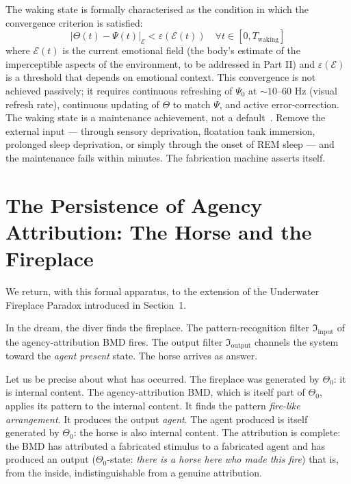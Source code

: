 The waking state is formally characterised as the condition in which the convergence criterion is satisfied:
%
\begin{equation}
|\Theta(t) - \Psi(t)|_{\mathcal{E}} < \varepsilon(\mathcal{E}(t)) \quad \forall t \in [0, T_{\mathrm{waking}}]
\label{eq:convergence}
\end{equation}
%
where $\mathcal{E}(t)$ is the current emotional field (the body's estimate of the imperceptible aspects of the environment, to be addressed in Part II) and $\varepsilon(\mathcal{E})$ is a threshold that depends on emotional context. This convergence is not achieved passively; it requires continuous refreshing of $\Psi_0$ at $\sim 10$--$60$ Hz (visual refresh rate), continuous updating of $\Theta$ to match $\Psi$, and active error-correction. The waking state is a maintenance achievement, not a default~\cite{author_dream}. Remove the external input --- through sensory deprivation, floatation tank immersion, prolonged sleep deprivation, or simply through the onset of REM sleep --- and the maintenance fails within minutes. The fabrication machine asserts itself.

\bigskip

\section{The Persistence of Agency Attribution: The Horse and the Fireplace}

We return, with this formal apparatus, to the extension of the Underwater Fireplace Paradox introduced in Section~1.

In the dream, the diver finds the fireplace. The pattern-recognition filter $\mathfrak{I}_{\mathrm{input}}$ of the agency-attribution BMD fires. The output filter $\mathfrak{I}_{\mathrm{output}}$ channels the system toward the \textit{agent present} state. The horse arrives as answer.

Let us be precise about what has occurred. The fireplace was generated by $\Theta_0$: it is internal content. The agency-attribution BMD, which is itself part of $\Theta_0$, applies its pattern to the internal content. It finds the pattern \textit{fire-like arrangement}. It produces the output \textit{agent}. The agent produced is itself generated by $\Theta_0$: the horse is also internal content. The attribution is complete: the BMD has attributed a fabricated stimulus to a fabricated agent and has produced an output ($\Theta_0$-state: \textit{there is a horse here who made this fire}) that is, from the inside, indistinguishable from a genuine attribution.


